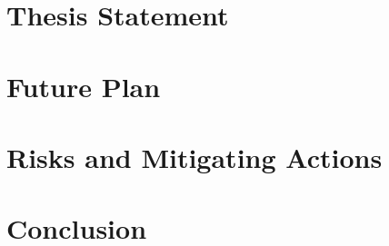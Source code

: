 \documentclass[draft]{report}
\begin{document}
\section{Thesis Statement}
\label{sec:thsis_statement}







\section{Future Plan}
\label{sec:future_plan}








\section{Risks and Mitigating Actions}
\label{sec:risks}







\section{Conclusion}
\label{sec:concluion}















\end{document}

